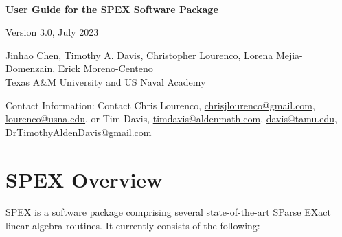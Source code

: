 \documentclass[12pt,oneside]{book}
\theoremstyle{definition}
\begin{document}
\thispagestyle{empty}
\begin{center}\begin{large}
    \phantom{.}\\[1in]
    \textbf{User Guide for the SPEX Software Package} \\
    \vspace{5mm}
    
    Version 3.0, July 2023 %
    \vspace{20mm}
    
    Jinhao Chen, Timothy A. Davis, Christopher Lourenco, Lorena Mejia-Domenzain, Erick Moreno-Centeno \\
    Texas A\&M University and US Naval Academy
    \vspace{20mm}
    
    Contact Information: Contact Chris Lourenco, \href{mailto:chrisjlourenco@gmail.com}{chrisjlourenco@gmail.com}, \href{mailto:lourenco@usna.edu}{lourenco@usna.edu}, or Tim Davis,
    \href{mailto:timdavis@aldenmath.com}{timdavis@aldenmath.com},
    \href{mailto:davis@tamu.edu}{davis@tamu.edu},
    \href{DrTimothyAldenDavis@gmail.com}{DrTimothyAldenDavis@gmail.com}
\end{large}\end{center}



\newpage
\tableofcontents


\chapter{SPEX Overview}\vspace{-0.75in}
SPEX is a software package comprising several state-of-the-art SParse EXact
linear algebra routines. It currently consists of the following:
\end{document}
